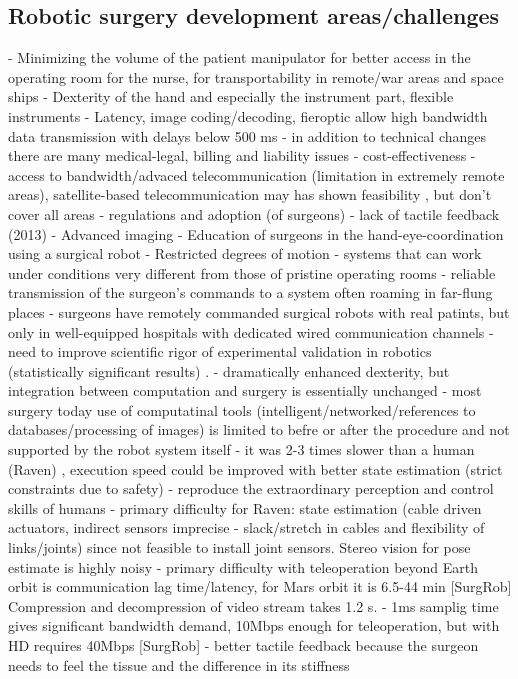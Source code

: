 \subsection{Robotic surgery development areas/challenges}
- Minimizing the volume of the patient manipulator for better access in the operating room for the nurse, for transportability in remote/war areas and space ships
- Dexterity of the hand and especially the instrument part, flexible instruments
- Latency, image coding/decoding, fieroptic allow high bandwidth data transmission with delays below 500 ms
- in addition to technical changes there are many medical-legal, billing and liability issues
- cost-effectiveness
- access to bandwidth/advaced telecommunication (limitation in extremely remote areas), satellite-based telecommunication may has shown feasibility \citep{bib:telesurg_history}, but don't cover all areas \citep{bib:docatadist}
- regulations and adoption (of surgeons)
- lack of tactile feedback (2013)
- Advanced imaging
- Education of surgeons in the hand-eye-coordination using a surgical robot
- Restricted degrees of motion
- systems that can work under conditions very different from those of pristine operating rooms \citep{bib:docatadist}
- reliable transmission of the surgeon's commands to a system often roaming in far-flung places
- surgeons have remotely commanded surgical robots with real patints, but only in well-equipped hospitals with dedicated wired communication channels
- need to improve scientific rigor of experimental validation in robotics (statistically significant results) \citep{bib:raven_ii}.
- dramatically enhanced dexterity, but integration between computation and surgery is essentially unchanged \citep{bib:raven_ii}
- most surgery today use of computatinal tools (intelligent/networked/references to databases/processing of images) is limited to befre or after the procedure and not supported by the robot system itself \citep{bib:raven_ii}
- it was 2-3 times slower than a human (Raven) \citep{bib:raven_debride}, execution speed could be improved with better state estimation (strict constraints due to safety)
- reproduce the extraordinary perception and control skills of humans \citep{bib:raven_debride}
- primary difficulty for Raven: state estimation (cable driven actuators, indirect sensors imprecise - slack/stretch in cables and flexibility of links/joints) since not feasible to install joint sensors. Stereo vision for pose estimate is highly noisy \citep{bib:raven_debride}
- primary difficulty with teleoperation beyond Earth orbit is communication lag time/latency, for Mars orbit it is 6.5-44 min [SurgRob] Compression and decompression of video stream takes 1.2 s.
- 1ms samplig time gives significant bandwidth demand, 10Mbps enough for teleoperation, but with HD requires 40Mbps [SurgRob]
- better tactile feedback because the surgeon needs to feel the tissue and the difference in its stiffness



